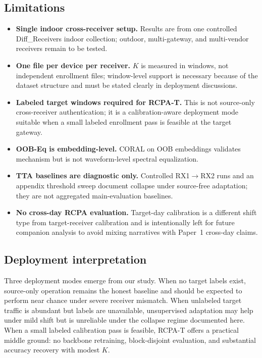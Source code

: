 \subsection{Limitations}
\begin{itemize}
  \item \textbf{Single indoor cross-receiver setup.} Results are from one controlled Diff\_Receivers indoor collection; outdoor, multi-gateway, and multi-vendor receivers remain to be tested.
  \item \textbf{One file per device per receiver.} $K$ is measured in windows, not independent enrollment files; window-level support is necessary because of the dataset structure and must be stated clearly in deployment discussions.
  \item \textbf{Labeled target windows required for RCPA-T.} This is not source-only cross-receiver authentication; it is a calibration-aware deployment mode suitable when a small labeled enrollment pass is feasible at the target gateway.
  \item \textbf{OOB-Eq is embedding-level.} CORAL on OOB embeddings validates mechanism but is not waveform-level spectral equalization.
  \item \textbf{TTA baselines are diagnostic only.} Controlled RX1$\rightarrow$RX2 runs and an appendix threshold sweep document collapse under source-free adaptation; they are not aggregated main-evaluation baselines.
  \item \textbf{No cross-day RCPA evaluation.} Target-day calibration is a different shift type from target-receiver calibration and is intentionally left for future companion analysis to avoid mixing narratives with Paper~1 cross-day claims.
\end{itemize}

\subsection{Deployment interpretation}
Three deployment modes emerge from our study.
When no target labels exist, source-only operation remains the honest baseline and should be expected to perform near chance under severe receiver mismatch.
When unlabeled target traffic is abundant but labels are unavailable, unsupervised adaptation may help under mild shift but is unreliable under the collapse regime documented here.
When a small labeled calibration pass is feasible, RCPA-T offers a practical middle ground: no backbone retraining, block-disjoint evaluation, and substantial accuracy recovery with modest $K$.

